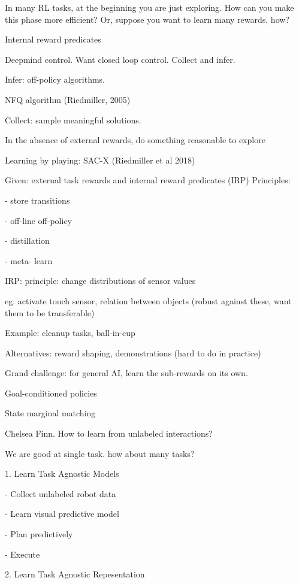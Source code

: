 \documentclass[english]{article}
\begin{document}
In many RL tasks, at the beginning you are just exploring. How can you make this phase more efficient? Or, suppose you want to learn many rewards, how?


\item Internal reward predicates

Deepmind control. Want closed loop control. Collect and infer. 

Infer: off-policy algorithms. 

NFQ algorithm (Riedmiller, 2005)

Collect: sample meaningful solutions. 

In the absence of external rewards, do something reasonable to explore

Learning by playing: SAC-X (Riedmiller et al 2018)

Given: external task rewards and internal reward predicates (IRP)
Principles:

- store transitions

- off-line off-policy 

- distillation

- meta- learn

IRP: principle: change distributions of sensor values

eg. activate touch sensor, relation between objects (robust against these, want them to be transferable)

Example: cleanup tasks, ball-in-cup

Alternatives: reward shaping, demonstrations (hard to do in practice)

Grand challenge: for general AI, learn the sub-rewards on its own. 

\item Goal-conditioned policies

\item State marginal matching

\item Chelsea Finn. How to learn from unlabeled interactions?

We are good at single task. how about many tasks?

1. Learn Task Agnostic Models

- Collect unlabeled robot data

- Learn visual predictive model

- Plan predictively

- Execute

2. Learn Task Agnostic Repesentation
\end{document}
